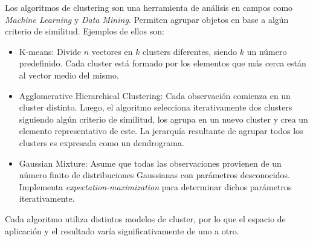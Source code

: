 \vspace{0.3cm}

Los algoritmos de clustering son una herramienta de an\'alisis en campos como
\textit{Machine Learning} y \textit{Data Mining}. Permiten agrupar objetos
en base a alg\'un criterio de similitud. Ejemplos de ellos son: 

\begin{itemize}
    \item K-means: Divide $n$ vectores en $k$ clusters diferentes, siendo $k$
                   un n\'umero predefinido. Cada cluster est\'a formado 
                   por los elementos que m\'as cerca est\'an al vector medio del
                   mismo. \cite{Hartigan1979}
    \item Agglomerative Hierarchical Clustering: Cada observaci\'on comienza en 
                   un cluster distinto. Luego, el algoritmo selecciona iterativamente
                   dos clusters siguiendo alg\'un criterio de similitud, los agrupa
                   en un nuevo cluster y crea un elemento representativo de este.
                   La jerarqu\'ia resultante de agrupar todos los clusters
                   es expresada como un dendrograma. \cite{Mining2009}
    \item Gaussian Mixture: Asume que todas las observaciones provienen de un 
                   n\'umero finito de distribuciones Gaussianas con par\'ametros
                   desconocidos. Implementa \textit{expectation-maximization} para
                   determinar dichos par\'ametros iterativamente. \cite{Mining2009}
\end{itemize}

Cada algoritmo utiliza distintos modelos de cluster, por lo que el espacio de
aplicaci\'on y el resultado var\'ia significativamente de uno a otro. \\

